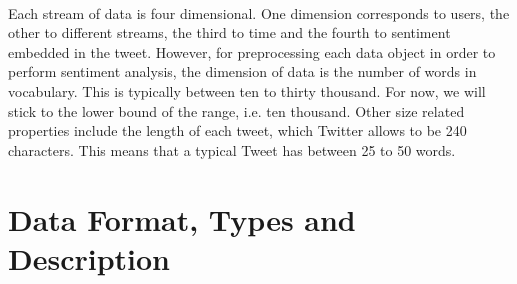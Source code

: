 \documentclass[11pt]{article}
\begin{document}
\paragraph{}
Each stream of data is four dimensional. One dimension corresponds to users, the other to different streams, the third to time and the fourth to sentiment embedded in the tweet. However, for preprocessing each data object in order to perform sentiment analysis, the dimension of data is the number of words in vocabulary. This is typically between ten to thirty thousand. For now, we will stick to the lower bound of the range, i.e. ten thousand. Other size related properties include the length of each tweet, which Twitter allows to be 240 characters. This means that a typical Tweet has between 25 to 50 words.

\section{Data Format, Types and Description}
\end{document}
